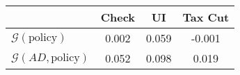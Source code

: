 \begin{tabular}{@{}lccc@{}}
\toprule
                          & Check      & UI    & Tax Cut    \\  \midrule
$\mathcal{G}(\text{policy})$ & 0.002  & 0.059  & -0.001     \\
$\mathcal{G}(AD,\text{policy})$ & 0.052  & 0.098  & 0.019     \\
\end{tabular}
